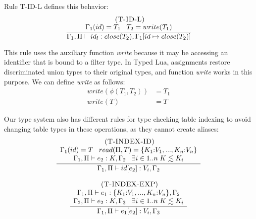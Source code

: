 \documentclass{sigplanconf}
\newcommand{\mylabel}[1]{\; (\textsc{#1})}
\newcommand{\env}{\Gamma}
\newcommand{\penv}{\Pi}
\begin{document}
Rule \textsc{T-ID-L} defines this behavior:
\[
\begin{array}{c}
\mylabel{T-ID-L}\\
\dfrac{\env_{1}(id) = T_{1} \;\;\; T_{2} = write(T_{1})}
      {\env_{1}, \penv \vdash id_{l}:close(T_{2}), \env_{1}[id \mapsto close(T_{2})]}
\end{array}
\]

This rule uses the auxiliary function \emph{write} because it may be
accessing an identifier that is bound to a filter type.
In Typed Lua, assignments restore discriminated union types to their original types,
and function \emph{write} works in this purpose.
We can define \emph{write} as follows:
\begin{align*}
write(\phi(T_{1},T_{2})) & = T_{1}\\
write(T) & = T
\end{align*}

Our type system also has different rules for type checking table indexing to avoid
changing table types in these operations, as they cannot create aliases:
\[
\begin{array}{c}
\begin{array}{c}
\mylabel{T-INDEX-ID}\\
\dfrac{\begin{array}{c}
       \env_{1}(id) = T \;\;\;
       read(\penv, T) = \{K_{1}{:}V_{1}, ..., K_{n}{:}V_{n}\}\\
       \env_{1}, \penv \vdash e_{2}:K, \env_{2} \;\;\;
       \exists i \in 1{..}n \; K \lesssim K_{i}
       \end{array}}
      {\env_{1}, \penv \vdash id[e_{2}]:V_{i}, \env_{2}}
\end{array}
\\ \\
\begin{array}{c}
\mylabel{T-INDEX-EXP}\\
\dfrac{\begin{array}{c}
       \env_{1}, \penv \vdash e_{1}:\{K_{1}{:}V_{1}, ..., K_{n}{:}V_{n}\}, \env_{2}\\
       \env_{2}, \penv \vdash e_{2}:K, \env_{3} \;\;\;
       \exists i \in 1{..}n \; K \lesssim K_{i}
       \end{array}}
      {\env_{1}, \penv \vdash e_{1}[e_{2}]:V_{i}, \env_{3}}
\end{array}
\end{array}
\]
\end{document}
